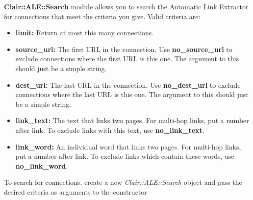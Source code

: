 \textbf{Clair::ALE::Search} module allows you to search the Automatic Link Extractor for connections that meet the criteria you give. Valid criteria are:

\begin{itemize}
  \item \textbf{limit:} Return at most this many connections.
  \item \textbf{source\_url:} The first URL in the connection. Use \textbf{no\_source\_url} to exclude connections where the first URL is this one. The argument to this should just be a simple string.
  \item \textbf{dest\_url:} The last URL in the connection. Use \textbf{no\_dest\_url} to exclude connections where the last URL is this one. The argument to this should just be a simple string.
  \item \textbf{link\_text:} The text that links two pages. For multi-hop links, put a number after link. To exclude links with this text, use \textbf{no\_link\_text}.
  \item \textbf{link\_word:} An individual word that links two pages. For multi-hop links, put a number after link. To exclude links which contain these words, use \textbf{no\_link\_word}.
\end{itemize}

To search for connections, create a new \emph{Clair::ALE::Search} object and pass the desired criteria as arguments to the constructor
\\
\\
\\
\\

